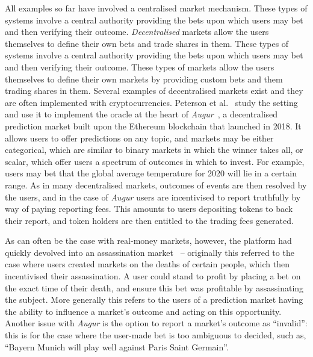 All examples so far have involved a centralised market mechanism. These types
of systems involve a central authority providing the bets upon which users may
bet and then verifying their outcome. \emph{Decentralised} markets allow the
users themselves to define their own bets and trade shares in them. These types
of systems involve a central authority providing the bets upon which users may
bet and then verifying their outcome. These types of markets allow the users
themselves to define their own markets by providing custom bets and them
trading shares in them. Several examples of decentralised markets exist and
they are often implemented with cryptocurrencies. Peterson et
al.~\cite{Peterson2015} study the setting and use it to implement the oracle at
the heart of \emph{Augur}~\cite{Augur}, a decentralised prediction market built
upon the Ethereum blockchain that launched in 2018. It allows users to offer
predictions on any topic, and markets may be either categorical, which are
similar to binary markets in which the winner takes all, or scalar, which offer
users a spectrum of outcomes in which to invest. For example, users may bet
that the global average temperature for 2020 will lie in a certain range.  As
in many decentralised markets, outcomes of events are then resolved by the
users, and in the case of \emph{Augur} users are incentivised to report
truthfully by way of paying reporting fees. This amounts to users depositing
tokens to back their report, and token holders are then entitled to the trading
fees generated.

As can often be the case with real-money markets, however, the platform had
quickly devolved into an assassination market~\cite{AugurDeathMarket} --
originally this referred to the case where users created markets on the deaths
of certain people, which then incentivised their assassination. A user could
stand to profit by placing a bet on the exact time of their death, and ensure
this bet was profitable by assassinating the subject. More generally this
refers to the users of a prediction market having the ability to influence a
market's outcome and acting on this opportunity. Another issue with
\emph{Augur} is the option to report a market's outcome as ``invalid'': this is
for the case where the user-made bet is too ambiguous to decided, such as,
``Bayern Munich will play well against Paris Saint Germain''.

